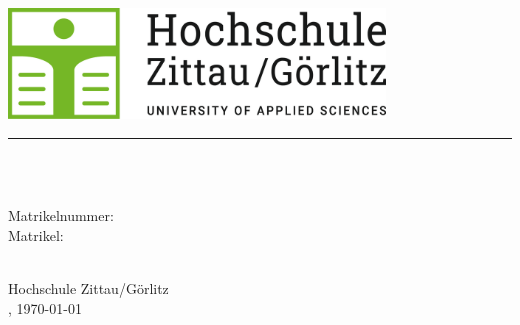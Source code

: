 \begin{titlepage}
    \begin{center}

        \vspace*{1cm}
        \includegraphics[width=0.75\textwidth]{images/hszg_logo.png}
        \vspace*{0.5cm}
        \hrule
        \vspace*{2cm}
        
        \Huge
        \textbf{\thesisTitle}
        
        \vspace*{0.5cm}
        \LARGE
        \moduleName\\
        \thesisType

        \vspace*{2cm}
        
        \textbf{\authorName}\\
        Matrikelnummer: \authorMatrikeln\\
        Matrikel: \authorMatrikel\\
        
        \vfill
        
        \Large
        \faculty\\
        Hochschule Zittau/Görlitz\\
        \place, \today\\
        
    \end{center}
\end{titlepage}